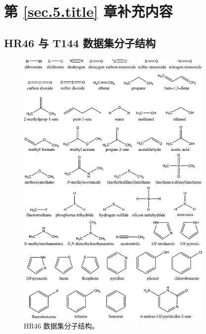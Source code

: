 
\section{第 \ref{sec.5.title} 章补充内容}

\subsection{HR46 与 T144 数据集分子结构}

\begin{figure}[H]
    \centering
    \includegraphics[width=0.85\textwidth]{assets/fig-s1.pdf}
    \caption[HR46 数据集分子结构]{HR46 数据集分子结构。}
    \label{fig.fig-s1}
\end{figure}

